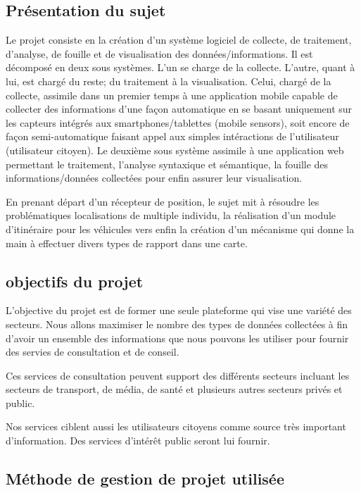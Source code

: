 \subsection{Présentation du sujet}

Le projet consiste en la création d'un système logiciel de collecte, de
traitement, d'analyse, de fouille et de visualisation des données/informations.
Il est décomposé en deux sous systèmes. L'un se charge de la collecte. L'autre,
quant à lui, est chargé du reste; du traitement à la visualisation.
Celui, chargé de la collecte, assimile dans un premier temps à une application
mobile capable de collecter des informations d'une façon automatique en se
basant uniquement sur les capteurs intégrés aux smartphones/tablettes
(mobile sensors), soit encore de façon semi-automatique faisant appel aux
simples intéractions de l'utilisateur (utilisateur citoyen).
Le deuxième sous système assimile à une application web permettant le
traitement, l'analyse syntaxique et sémantique, la fouille des
informations/données collectées pour enfin assurer leur visualisation.

En prenant départ d'un récepteur de position, le sujet mit à résoudre les
problématiques localisations de multiple individu, la réalisation d'un module
d'itinéraire pour les véhicules vers enfin la création d'un mécanisme qui donne
la main à effectuer divers types de rapport dans une carte.

\subsection{objectifs du projet}

L'objective du projet est de former une seule plateforme qui vise une variété
des secteurs. Nous allons maximiser le nombre des types de données collectées à
fin d'avoir un ensemble des informations que nous pouvons les utiliser pour
fournir des servies de consultation et de conseil.

Ces services de consultation peuvent support des différents secteurs incluant
les secteurs de transport, de média, de santé et plusieurs autres secteurs
privés et public.

Nos services ciblent aussi les utilisateurs citoyens comme source très
important d'information. Des services d'intérêt public seront lui fournir.

\subsection{Méthode de gestion de projet utilisée}

